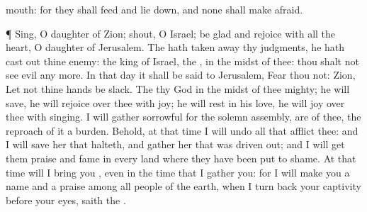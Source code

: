 {mouth: for they shall
feed and lie
down, and none shall make
{}
afraid.
\par }{\PP {}¶
Sing, O
daughter of
Zion;
shout, O
Israel; be
glad and
rejoice with all the
heart, O
daughter of
Jerusalem.
The
{} hath taken
away thy
judgments, he hath cast
out thine
enemy: the
king of
Israel,
{} the
{},
{} in the
midst of thee: thou shalt not
see
evil any more.
In that
day it shall be
said to
Jerusalem,
Fear thou not:
{}
Zion, Let not thine
hands be
slack.
The
{} thy
God in the
midst of thee
{}
mighty; he will
save, he will
rejoice over thee with
joy; he will
rest in his
love, he will
joy over thee with
singing.
I will
gather
{}
sorrowful for the solemn
assembly,
{} are of thee,
{} the
reproach of it
{} a
burden.
Behold, at that
time I will
undo all that
afflict thee: and I will
save her that
halteth, and
gather her that was driven
out; and I will
get them
praise and
fame in every
land where they have been put to
shame.
At that
time will I
bring you
{}, even in the
time that I
gather you: for I will
make you a
name and a
praise among all
people of the
earth, when I turn
back your
captivity before your
eyes,
saith the
{}.
\par }